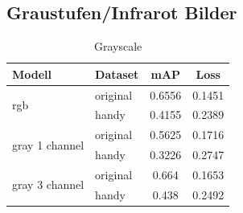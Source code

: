 \subsection{Graustufen/Infrarot Bilder}\label{subsec:eval_gray}


\begin{table}[htb]
    \centering
    \label{tab:eval_gray}
    \begin{tabular}{| l | l || c | c |} 
        \hline
        Modell & Dataset & mAP & Loss\\
        \hline
        \multirow{2}{*}{rgb} & original & 0.6556 & 0.1451 \\
        & handy & 0.4155 & 0.2389 \\
        \hline
        \multirow{2}{*}{gray 1 channel} & original & 0.5625 & 0.1716 \\
        & handy & 0.3226 & 0.2747 \\
        \hline
        \multirow{2}{*}{gray 3 channel} & original & 0.664 & 0.1653 \\
        & handy & 0.438 & 0.2492 \\
        \hline
    \end{tabular}        
    \caption{Grayscale}
\end{table}





